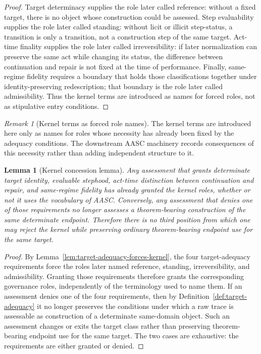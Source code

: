 \documentclass[11pt]{article}
\newtheorem{lemma}[theorem]{Lemma}
\theoremstyle{definition}
\theoremstyle{remark}
\newtheorem{remark}[theorem]{Remark}
\begin{document}
\begin{proof}
Target determinacy supplies the role later called reference: without a fixed target, there is no object whose construction could be assessed. Step evaluability supplies the role later called standing: without licit or illicit step-status, a transition is only a transition, not a construction step of the same target. Act-time finality supplies the role later called irreversibility: if later normalization can preserve the same act while changing its status, the difference between continuation and repair is not fixed at the time of performance. Finally, same-regime fidelity requires a boundary that holds those classifications together under identity-preserving redescription; that boundary is the role later called admissibility. Thus the kernel terms are introduced as names for forced roles, not as stipulative entry conditions.
\end{proof}

\begin{remark}[Kernel terms as forced role names]
The kernel terms are introduced here only as names for roles whose necessity has already been fixed by the adequacy conditions. The downstream AASC machinery records consequences of this necessity rather than adding independent structure to it.
\end{remark}

\begin{lemma}[Kernel concession lemma]\label{lem:kernel-concession}
Any assessment that grants determinate target identity, evaluable stephood, act-time distinction between continuation and repair, and same-regime fidelity has already granted the kernel roles, whether or not it uses the vocabulary of AASC. Conversely, any assessment that denies one of those requirements no longer assesses a theorem-bearing construction of the same determinate endpoint. Therefore there is no third position from which one may reject the kernel while preserving ordinary theorem-bearing endpoint use for the same target.
\end{lemma}

\begin{proof}
By Lemma~\ref{lem:target-adequacy-forces-kernel}, the four target-adequacy requirements force the roles later named reference, standing, irreversibility, and admissibility. Granting those requirements therefore grants the corresponding governance roles, independently of the terminology used to name them. If an assessment denies one of the four requirements, then by Definition~\ref{def:target-adequacy} it no longer preserves the conditions under which a raw trace is assessable as construction of a determinate same-domain object. Such an assessment changes or exits the target class rather than preserving theorem-bearing endpoint use for the same target. The two cases are exhaustive: the requirements are either granted or denied.
\end{proof}
\end{document}
